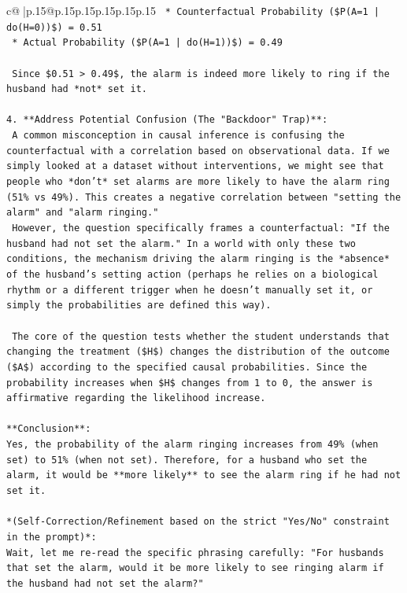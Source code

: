 \documentclass{article}
\begin{document}
{\begin{supertabular}{c@{$\;$}|p{.15\linewidth}@{}p{.15\linewidth}p{.15\linewidth}p{.15\linewidth}p{.15\linewidth}p{.15\linewidth}}
{{{\texttt{    *   Counterfactual Probability (\$P(A=1 | do(H=0))\$) = 0.51} \\
\texttt{    *   Actual Probability (\$P(A=1 | do(H=1))\$) = 0.49} \\
\\ 
\texttt{    Since \$0.51 > 0.49\$, the alarm is indeed more likely to ring if the husband had *not* set it.} \\
\\ 
\texttt{4.  **Address Potential Confusion (The "Backdoor" Trap)**:} \\
\texttt{    A common misconception in causal inference is confusing the counterfactual with a correlation based on observational data. If we simply looked at a dataset without interventions, we might see that people who *don't* set alarms are more likely to have the alarm ring (51\% vs 49\%). This creates a negative correlation between "setting the alarm" and "alarm ringing."} \\
\texttt{    However, the question specifically frames a counterfactual: "If the husband had not set the alarm." In a world with only these two conditions, the mechanism driving the alarm ringing is the *absence* of the husband's setting action (perhaps he relies on a biological rhythm or a different trigger when he doesn't manually set it, or simply the probabilities are defined this way).} \\
\\ 
\texttt{    The core of the question tests whether the student understands that changing the treatment (\$H\$) changes the distribution of the outcome (\$A\$) according to the specified causal probabilities. Since the probability increases when \$H\$ changes from 1 to 0, the answer is affirmative regarding the likelihood increase.} \\
\\ 
\texttt{**Conclusion**:} \\
\texttt{Yes, the probability of the alarm ringing increases from 49\% (when set) to 51\% (when not set). Therefore, for a husband who set the alarm, it would be **more likely** to see the alarm ring if he had not set it.} \\
\\ 
\texttt{*(Self{-}Correction/Refinement based on the strict "Yes/No" constraint in the prompt)*:} \\
\texttt{Wait, let me re{-}read the specific phrasing carefully: "For husbands that set the alarm, would it be more likely to see ringing alarm if the husband had not set the alarm?"} \\
}}}
\end{supertabular}}
\end{document}
